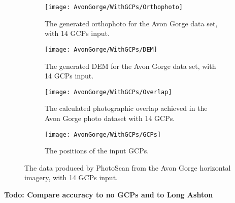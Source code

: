 \begin{figure}
    \centering
    \begin{subfigure}[b]{0.45\textwidth}
        \texttt{[image: AvonGorge/WithGCPs/Orthophoto]}
        \caption{The generated orthophoto for the Avon Gorge data set, with 14
        GCPs input.}
        \label{img:avon-gorge/with-gcps/orthophoto}
    \end{subfigure}
    \begin{subfigure}[b]{0.45\textwidth}
        \texttt{[image: AvonGorge/WithGCPs/DEM]}
        \caption{The generated DEM for the Avon Gorge data set, with 14 GCPs
        input.}
        \label{img:avon-gorge/with-gcps/dem}
    \end{subfigure}
    \begin{subfigure}[b]{0.45\textwidth}
        \texttt{[image: AvonGorge/WithGCPs/Overlap]}
        \caption{The calculated photographic overlap achieved in the Avon Gorge
        photo dataset with 14 GCPs.}
        \label{img:avon-gorge/with-gcps/overlap}
    \end{subfigure}
    \begin{subfigure}[b]{0.45\textwidth}
        \texttt{[image: AvonGorge/WithGCPs/GCPs]}
        \caption{The positions of the input GCPs.}
        \label{img:avon-gorge/with-gcps/gcps}
    \end{subfigure}
    \caption{The data produced by PhotoScan from the Avon Gorge horizontal
    imagery, with 14 GCPs input.}
    \label{img:avon-gorge/with-gcps}
\end{figure}

\textbf{Todo: Compare accuracy to no GCPs and to Long Ashton} \\
